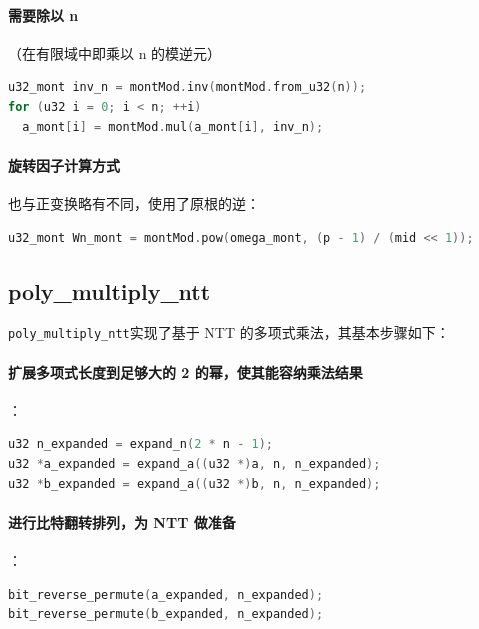 \documentclass[a4paper]{article}
\begin{document}
\paragraph{需要除以 n}

（在有限域中即乘以 n 的模逆元）

\begin{lstlisting}[language=C++]
u32_mont inv_n = montMod.inv(montMod.from_u32(n));
for (u32 i = 0; i < n; ++i)
  a_mont[i] = montMod.mul(a_mont[i], inv_n);
\end{lstlisting}

\paragraph{旋转因子计算方式}

也与正变换略有不同，使用了原根的逆：

\begin{lstlisting}[language=C++]
u32_mont Wn_mont = montMod.pow(omega_mont, (p - 1) / (mid << 1));
\end{lstlisting}

\subsection{poly\_multiply\_ntt}

\texttt{poly\_multiply\_ntt}实现了基于 NTT 的多项式乘法，其基本步骤如下：

\paragraph{扩展多项式长度到足够大的 2 的幂，使其能容纳乘法结果}

：

\begin{lstlisting}[language=C++]
u32 n_expanded = expand_n(2 * n - 1);
u32 *a_expanded = expand_a((u32 *)a, n, n_expanded);
u32 *b_expanded = expand_a((u32 *)b, n, n_expanded);
\end{lstlisting}

\paragraph{进行比特翻转排列，为 NTT 做准备}

：

\begin{lstlisting}[language=C++]
bit_reverse_permute(a_expanded, n_expanded);
bit_reverse_permute(b_expanded, n_expanded);
\end{lstlisting}
\end{document}
